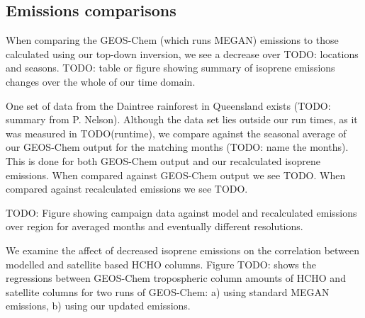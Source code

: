 \documentclass[acp, manuscript]{copernicus} %
\begin{document}
  \subsection{Emissions comparisons}
    
    When comparing the GEOS-Chem (which runs MEGAN) emissions to those calculated using our top-down inversion, we see a decrease over TODO: locations and seasons.
    TODO: table or figure showing summary of isoprene emissions changes over the whole of our time domain.
    
    One set of data from the Daintree rainforest in Queensland exists (TODO: summary from P. Nelson).
    Although the data set lies outside our run times, as it was measured in TODO(runtime), we compare against the seasonal average of our GEOS-Chem output for the matching months (TODO: name the months).
    This is done for both GEOS-Chem output and our recalculated isoprene emissions.
    When compared against GEOS-Chem output we see TODO.
    When compared against recalculated emissions we see TODO.
    
    TODO: Figure showing campaign data against model and recalculated emissions over region for averaged months and eventually different resolutions.
    
    We examine the affect of decreased isoprene emissions on the correlation between modelled and satellite based HCHO columns.
    Figure TODO: shows the regressions between GEOS-Chem tropospheric column amounts of HCHO and satellite columns for two runs of GEOS-Chem: a) using standard MEGAN emissions, b) using our updated emissions.
    
    
    
\conclusions  %


\appendix

\appendixfigures  %
\appendixtables   %
\end{document}
